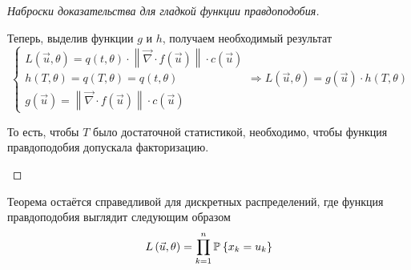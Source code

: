 \begin{proof}[Наброски доказательства для гладкой функции правдоподобия]
\begin{enumerate}
            Теперь, выделив функции $g$ и $h$, получаем необходимый результат
            $$\begin{cases}
                L\left( \vec{u}, \theta \right)
                    = q\left( t, \theta \right)
                        \cdot \left\| \vec{\nabla}
                            \cdot f\left( \vec{u} \right) \right\|
                            \cdot c\left( \vec{u} \right) \\
                h\left( T, \theta \right)
                    = q\left( T, \theta \right)
                    = q\left( t, \theta \right) \\
                g\left( \vec{u} \right)
                    = \left\| \vec{\nabla}
                            \cdot f\left( \vec{u} \right) \right\|
                        \cdot c\left( \vec{u} \right)
            \end{cases}
                \Rightarrow
                L\left( \vec{u}, \theta \right)
                    = g\left( \vec{u} \right) \cdot h\left( T, \theta \right)$$

           То есть, чтобы $T$ было достаточной статистикой, необходимо, чтобы
           функция правдоподобия допускала факторизацию.
    \end{enumerate}
\end{proof}

\begin{remark}
    Теорема остаётся справедливой для дискретных распределений,
    где функция правдоподобия выглядит следующим образом
    $$L\left( \vec{u}, \theta \right) = \prod_{k=1}^n \mathbb{P}_{{}}\left\{ x_k = u_k \right\}$$
\end{remark}


